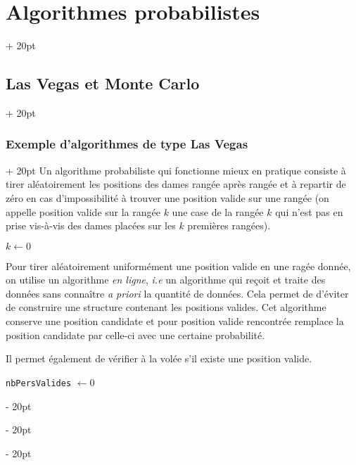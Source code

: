 \documentclass[a4paper, 12pt, twoside]{article}
\newenvironment{indalgo}[2][H]{
    \begin{algoBox}
        \begin{algorithm}[#1]
            \caption{#2}
}
{
        \end{algorithm}
    \end{algoBox}
}
\newcommand{\ind}[1][20pt]{\advance\leftskip + #1}
\newcommand{\deind}[1][20pt]{\advance\leftskip - #1}
\newenvironment{indt}[2][20pt]{#2 \par \ind[#1]}{\par \deind} %
\newcommand{\1}{\mathbbm 1}
\begin{document}
\begin{indt}{\section{Algorithmes probabilistes}}
\begin{indt}{\subsection{Las Vegas et Monte Carlo}}
\begin{indt}{\subsubsection{Exemple d'algorithmes de type Las Vegas}}
                Un algorithme probabiliste qui fonctionne mieux en pratique consiste à tirer aléatoirement les positions des dames rangée après rangée et à repartir de zéro en cas d'impossibilité à trouver une position valide sur une rangée (on appelle position valide sur la rangée $k$ une case de la rangée $k$ qui n'est pas en prise vis-à-vis des dames placées sur les $k$ premières rangées).

                \begin{indalgo}{Solution probabiliste au problème des $N$ reines}
                    \label{alg:6}

                    $k \gets 0$\;

                \end{indalgo}

                Pour tirer aléatoirement uniformément une position valide en une ragée donnée, on utilise un algorithme \emph{en ligne}, \textit{i.e} un algorithme qui reçoit et traite des données sans connaître \textit{a priori} la quantité de données.
                Cela permet de d'éviter de construire une structure contenant les positions valides.
                Cet algorithme conserve une position candidate et pour position valide rencontrée remplace la position candidate par celle-ci avec une certaine probabilité.

                Il permet également de vérifier à la volée s'il existe une position valide.

                \begin{indalgo}{Tirage aléatoire uniforme de la position}
                    \label{alg:7}

                    \texttt{nbPersValides} $\gets 0$\;

\end{indalgo}
\end{indt}
\end{indt}
\end{indt}
\end{document}
